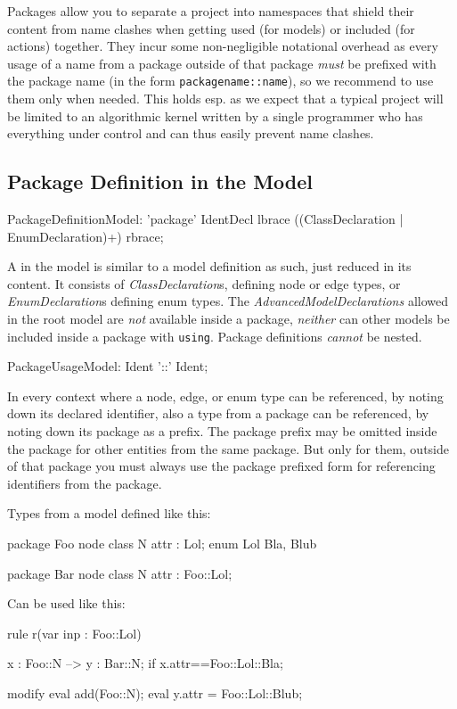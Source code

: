 Packages allow you to separate a project into namespaces that shield their content from name clashes when getting used (for models) or included (for actions) together.
They incur some non-negligible notational overhead as every usage of a name from a package outside of that package \emph{must} be prefixed with the package name (in the form \verb#packagename::name#), so we recommend to use them only when needed.
This holds esp. as we expect that a typical project will be limited to an algorithmic kernel written by a single programmer who has everything under control and can thus easily prevent name clashes.

\subsection{Package Definition in the Model}\label{sub:packagemodel} 

\begin{rail}
  PackageDefinitionModel: 'package' IdentDecl lbrace
	                   ((ClassDeclaration
  									 | EnumDeclaration)+)
										rbrace;
\end{rail}

A  in the model is similar to a model definition as such, just reduced in its content.
It consists of \emph{ClassDeclaration}s, defining node or edge types, or \emph{EnumDeclaration}s defining enum types.
The \emph{AdvancedModelDeclarations} allowed in the root model are \emph{not} available inside a package, \emph{neither} can other models be included inside a package with \texttt{using}.
Package definitions \emph{cannot} be nested.

\begin{rail}
  PackageUsageModel: Ident '::' Ident;
\end{rail}

In every context where a node, edge, or enum type can be referenced,
by noting down its declared identifier, 
also a type from a package can be referenced,
by noting down its package as a prefix.
The package prefix may be omitted inside the package for other entities from the same package.
But only for them, outside of that package you must always use the package prefixed form for referencing identifiers from the package.

\begin{example}
Types from a model defined like this:
	\begin{grgen}
package Foo {
	node class N {
		attr : Lol;
	}
	enum Lol {
		Bla,
		Blub
	}
}

package Bar {
	node class N {
		attr : Foo::Lol;
	}	
}
	\end{grgen}
Can be used like this:
	\begin{grgen}
rule r(var inp : Foo::Lol) {
	x : Foo::N --> y : Bar::N;
	if{ x.attr==Foo::Lol::Bla; }

	modify {
		eval{ add(Foo::N); }
		eval{ y.attr = Foo::Lol::Blub; }
	}
}	
	\end{grgen}
\end{example}
	
